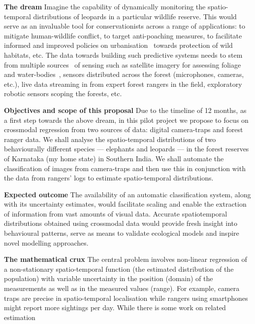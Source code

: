 \documentclass[a4paper,10pt,twocolumn]{article}
\newcommand{\hdg}[1] {\noindent \textbf{#1} }
\begin{document}
\hdg{The dream}
Imagine the capability of dynamically monitoring the spatio-temporal distributions of leopards in a particular wildlife reserve. This would serve as an invaluable tool for conservationists across a range of applications: to mitigate human-wildlife conflict, to target anti-poaching measures, to facilitate informed and improved policies on urbanisation~\cite{gubbi2005new} towards protection of wild habitats, etc. The data towards building such predictive systems needs to stem from multiple sources~\cite{bliznyuk2014nonlinear} of sensing such as satellite imagery for assessing foliage and water-bodies~\cite{urthecast}, sensors distributed across the forest (microphones, cameras, etc.), live data streaming in from expert forest rangers in the field, exploratory robotic sensors scoping the forests, etc. 

\hdg{Objectives and scope of this proposal} 
Due to the timeline of 12 months,  as a first step towards the above dream, in this pilot project we propose to focus on crossmodal regression from two sources of data: digital camera-traps and forest ranger data. We shall analyse the spatio-temporal distributions of two behaviourally different species --- elephants and leopards --- in the forest reserves of Karnataka (my home state) in Southern India. We shall automate the classification of images from camera-traps and then use this in conjunction with the data from rangers' logs to estimate spatio-temporal distributions.

\hdg{Expected outcome} The availability of an automatic classification system, along with its uncertainty estimates, would facilitate scaling and enable the extraction of information from vast amounts of visual data. Accurate spatiotemporal distributions obtained using crossmodal data would provide fresh insight into behavioural patterns, serve as means to validate ecological models and inspire novel modelling approaches. 


\hdg{The mathematical crux} The central problem involves non-linear regression of a non-stationary spatio-temporal function (the estimated distribution of the population) with variable uncertainty in the position (domain) of the measurements as well as in the measured values (range). For example, camera traps are precise in spatio-temporal localisation while rangers using smartphones might report more sightings per day. While there is some work on related estimation~\cite{bliznyuk2014nonlinear}
\end{document}
